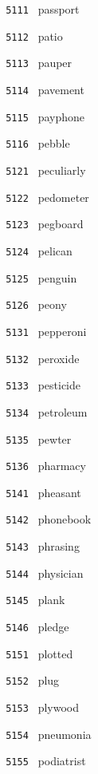 \documentclass[11pt]{article}
\begin{document}
\begin{multicols}{6}
\footnotesize
\noindent \texttt{ 5111 } passport  \par
\noindent \texttt{ 5112 } patio  \par
\noindent \texttt{ 5113 } pauper  \par
\noindent \texttt{ 5114 } pavement  \par
\noindent \texttt{ 5115 } payphone  \par
\noindent \texttt{ 5116 } pebble  \par
\vspace{3mm}
\noindent \texttt{ 5121 } peculiarly  \par
\noindent \texttt{ 5122 } pedometer  \par
\noindent \texttt{ 5123 } pegboard  \par
\noindent \texttt{ 5124 } pelican  \par
\noindent \texttt{ 5125 } penguin  \par
\noindent \texttt{ 5126 } peony  \par
\vspace{3mm}
\noindent \texttt{ 5131 } pepperoni  \par
\noindent \texttt{ 5132 } peroxide  \par
\noindent \texttt{ 5133 } pesticide  \par
\noindent \texttt{ 5134 } petroleum  \par
\noindent \texttt{ 5135 } pewter  \par
\noindent \texttt{ 5136 } pharmacy  \par
\vspace{3mm}
\noindent \texttt{ 5141 } pheasant  \par
\noindent \texttt{ 5142 } phonebook  \par
\noindent \texttt{ 5143 } phrasing  \par
\noindent \texttt{ 5144 } physician  \par
\noindent \texttt{ 5145 } plank  \par
\noindent \texttt{ 5146 } pledge  \par
\vspace{3mm}
\noindent \texttt{ 5151 } plotted  \par
\noindent \texttt{ 5152 } plug  \par
\noindent \texttt{ 5153 } plywood  \par
\noindent \texttt{ 5154 } pneumonia  \par
\noindent \texttt{ 5155 } podiatrist  \par

\end{multicols}
\end{document}
